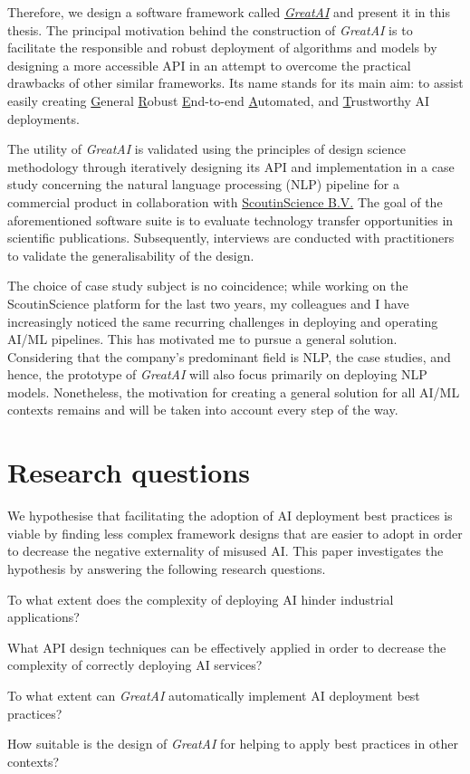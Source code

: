 Therefore, we design a software framework called \href{https://github.com/schmelczer/great-ai}{\textit{GreatAI}} and present it in this thesis. The principal motivation behind the construction of \textit{GreatAI} is to facilitate the responsible and robust deployment of algorithms and models by designing a more accessible API in an attempt to overcome the practical drawbacks of other similar frameworks. Its name stands for its main aim: to assist easily creating \underline{G}eneral \underline{R}obust \underline{E}nd-to-end \underline{A}utomated, and \underline{T}rustworthy AI deployments.

The utility of \textit{GreatAI} is validated using the principles of design science methodology \cite{wieringa2014design} through iteratively designing its API and implementation in a case study concerning the natural language processing (NLP) pipeline for a commercial product in collaboration with \href{https://scoutinscience.com/}{ScoutinScience B.V.} The goal of the aforementioned software suite is to evaluate technology transfer opportunities in scientific publications. Subsequently, interviews are conducted with practitioners to validate the generalisability of the design.

The choice of case study subject is no coincidence; while working on the ScoutinScience platform for the last two years, my colleagues and I have increasingly noticed the same recurring challenges in deploying and operating AI/ML pipelines. This has motivated me to pursue a general solution. Considering that the company's predominant field is NLP, the case studies, and hence, the prototype of \textit{GreatAI} will also focus primarily on deploying NLP models. Nonetheless, the motivation for creating a general solution for all AI/ML contexts remains and will be taken into account every step of the way.

\section{Research questions}

We hypothesise that facilitating the adoption of AI deployment best practices is viable by finding less complex framework designs that are easier to adopt in order to decrease the negative externality of misused AI. This paper investigates the hypothesis by answering the following research questions. 

\begin{rqlist}
  \item To what extent does the complexity of deploying AI hinder industrial applications?
  \item What API design techniques can be effectively applied in order to decrease the complexity of correctly deploying AI services?
  \item To what extent can \textit{GreatAI} automatically implement AI deployment best practices?
  \item How suitable is the design of \textit{GreatAI} for helping to apply best practices in other contexts?
\end{rqlist}

